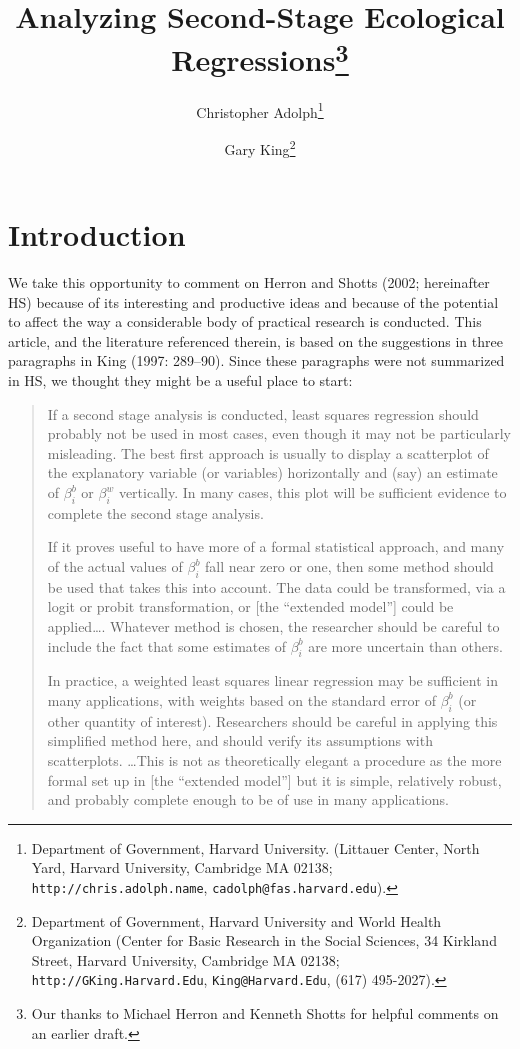 \documentclass[11pt,titlepage]{article}
\title{Analyzing Second-Stage Ecological Regressions\thanks{Our thanks
    to Michael Herron and Kenneth Shotts for helpful comments on an
    earlier draft.}}
\author{Christopher Adolph\thanks{Department of Government, Harvard
    University. (Littauer Center, North Yard, Harvard University,
    Cambridge MA 02138; \texttt{http://chris.adolph.name},
    \texttt{cadolph@fas.harvard.edu}).}
\and %
Gary King\thanks{Department of Government, Harvard University and
  World Health Organization (Center for Basic Research in the Social
  Sciences, 34 Kirkland Street, Harvard University, Cambridge MA
  02138; \texttt{http://GKing.Harvard.Edu}, \texttt{King@Harvard.Edu},
  (617) 495-2027).}  }
\begin{document}
\maketitle

\section{Introduction}

We take this opportunity to comment on Herron and Shotts (2002;
hereinafter HS) because of its interesting and productive ideas and
because of the potential to affect the way a considerable body of
practical research is conducted.  This article, and the literature
referenced therein, is based on the suggestions in three paragraphs in
King (1997: 289--90).  Since these paragraphs were not summarized in
HS, we thought they might be a useful place to start:
\begin{quotation}
  If a second stage analysis is conducted, least squares regression
  should probably not be used in most cases, even though it may not be
  particularly misleading.  The best first approach is usually to
  display a scatterplot of the explanatory variable (or variables)
  horizontally and (say) an estimate of $\beta_i^b$ or $\beta_i^w$
  vertically.  In many cases, this plot will be sufficient evidence to
  complete the second stage analysis.
  
  If it proves useful to have more of a formal statistical approach,
  and many of the actual values of $\beta_i^b$ fall near zero or one,
  then some method should be used that takes this into account.  The
  data could be transformed, via a logit or probit transformation, or
  [the ``extended model''] could be applied\ldots.  Whatever method is
  chosen, the researcher should be careful to include the fact that
  some estimates of $\beta_i^b$ are more uncertain than others.
    
  In practice, a weighted least squares linear regression may be
  sufficient in many applications, with weights based on the standard
  error of $\beta_i^b$ (or other quantity of interest).  Researchers
  should be careful in applying this simplified method here, and
  should verify its assumptions with scatterplots. \ldots This is not
  as theoretically elegant a procedure as the more formal set up in
  [the ``extended model''] but it is simple, relatively robust, and
  probably complete enough to be of use in many applications.
\end{quotation}  
\end{document}

